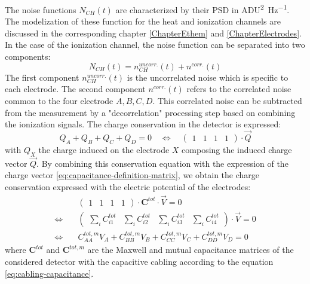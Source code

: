 The noise functions $N_{CH}(t)$ are characterized by their PSD in \si{\textsf{ADU}^2\per\Hz}. The modelization of these function for the heat and ionization channels are discussed in the corresponding chapter \ref{ChapterEthem} and \ref{ChapterElectrodes}. In the case of the ionization channel, the noise function can be separated into two components:
\begin{equation}
\label{eq:noise-corr}
N_{CH}(t) = n_{CH}^{uncorr.}(t) + n^{corr.}(t)
\end{equation}
The first component $n_{CH}^{uncorr.}(t)$ is the uncorrelated noise which is specific to each electrode. The second component $n^{corr.}(t)$ refers to the correlated noise common to the four electrode $A,B,C,D$. This correlated noise can be subtracted from the measurement by a "decorrelation" processing step based on combining the ionization signals.
The charge conservation in the detector is expressed:
\begin{equation}
\label{eq:charge-conservation}
Q_A + Q_B + Q_C + Q_D = 0
\quad \Leftrightarrow \quad
\begin{pmatrix}
1 & 1 & 1 & 1
\end{pmatrix}
\cdot \vec{Q} 
\end{equation}
 with $Q_X$ the charge induced on the electrode $X$ composing the induced charge vector $\vec{Q}$. By combining this conservation equation with the expression of the charge vector \ref{eq:capacitance-definition-matrix}, we obtain the charge conservation expressed with the electric potential of the electrodes:
\begin{equation}
\begin{split}
& \begin{pmatrix}
1 & 1 & 1 & 1
\end{pmatrix} \cdot 
\bm{C}^{tot} \cdot \vec{V} = 0 \\
\Leftrightarrow \quad & 
\begin{pmatrix}
\sum_i C_{i1}^{tot} & \sum_i C_{i2}^{tot} & \sum_i C_{i3}^{tot} & \sum_i C_{i4}^{tot}
\end{pmatrix}
\cdot \vec{V} = 0 \\
\Leftrightarrow \quad &
C_{AA}^{tot, m} V_A + C_{BB}^{tot, m} V_B + C_{CC}^{tot, m} V_C + C_{DD}^{tot, m} V_D = 0
\end{split}
\end{equation}
where $\bm{C}^{tot}$ and $\bm{C}^{tot, m}$ are the Maxwell and mutual capacitance matrices of the considered detector with the capacitive cabling according to the equation \ref{eq:cabling-capacitance}.
